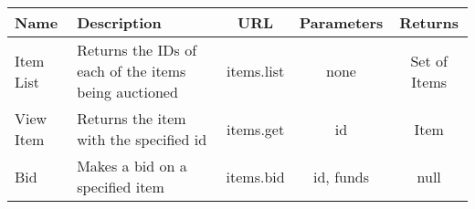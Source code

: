 \documentclass{article}
\begin{document}
\begin{center}
\begin{tabular}{|| m{5 em} | m{15 em} | c | c | c ||}
    \hline
    Name & Description & URL & Parameters & Returns \\
    \hline
    \hline
    Item List & Returns the IDs of each of the items being auctioned & items.list & none & Set of Items \\
    \hline
    View Item & Returns the item with the specified id & items.get & id & Item \\
    \hline
    Bid & Makes a bid on a specified item & items.bid & id, funds & null \\
    \hline
\end{tabular}
\end{center}
\end{document}

